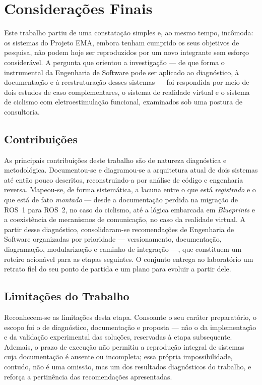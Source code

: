 \chapter{Considerações Finais}
\label{cap:consideracoes}

Este trabalho partiu de uma constatação simples e, ao mesmo tempo, incômoda: os sistemas do
Projeto EMA, embora tenham cumprido os seus objetivos de pesquisa, não podem hoje ser
reproduzidos por um novo integrante sem esforço considerável. A pergunta que orientou a
investigação --- de que forma o instrumental da Engenharia de Software pode ser aplicado ao
diagnóstico, à documentação e à reestruturação desses sistemas --- foi respondida por meio de
dois estudos de caso complementares, o sistema de realidade virtual e o sistema de ciclismo
com eletroestimulação funcional, examinados sob uma postura de consultoria.

\section{Contribuições}
\label{sec:contribuicoes}

As principais contribuições deste trabalho são de natureza diagnóstica e metodológica.
Documentou-se e diagramou-se a arquitetura atual de dois sistemas até então pouco descritos,
reconstruindo-a por análise de código e engenharia reversa. Mapeou-se, de forma sistemática,
a lacuna entre o que está \emph{registrado} e o que está de fato \emph{montado} --- desde a
documentação perdida na migração de ROS~1 para ROS~2, no caso do ciclismo, até a lógica
embarcada em \emph{Blueprints} e a coexistência de mecanismos de comunicação, no caso da
realidade virtual. A partir desse diagnóstico, consolidaram-se recomendações de Engenharia de
Software organizadas por prioridade --- versionamento, documentação, diagramação,
modularização e caminho de integração ---, que constituem um roteiro acionável para as etapas
seguintes. O conjunto entrega ao laboratório um retrato fiel do seu ponto de partida e um
plano para evoluir a partir dele.

\section{Limitações do Trabalho}
\label{sec:limitacoes-trabalho}

Reconhecem-se as limitações desta etapa. Consoante o seu caráter preparatório, o escopo foi o
de diagnóstico, documentação e proposta --- não o da implementação e da validação
experimental das soluções, reservadas à etapa subsequente. Ademais, o prazo de execução não
permitiu a reprodução integral de sistemas cuja documentação é ausente ou incompleta; essa
própria impossibilidade, contudo, não é uma omissão, mas um dos resultados diagnósticos do
trabalho, e reforça a pertinência das recomendações apresentadas.

